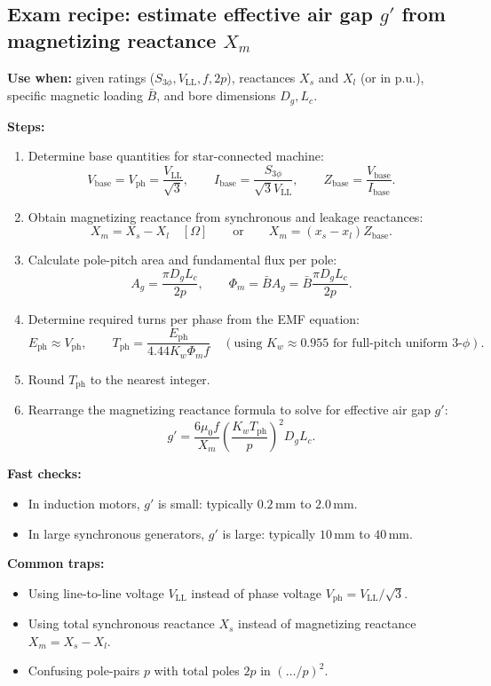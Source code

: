 \subsection{Exam recipe: estimate effective air gap $g'$ from magnetizing reactance $X_m$}

\textbf{Use when:} given ratings (\(S_{3\phi}, V_{\mathrm{LL}}, f, 2p\)), reactances \(X_s\) and \(X_l\) (or in p.u.), specific magnetic loading \(\bar{B}\), and bore dimensions \(D_g, L_c\).

\textbf{Steps:}
\begin{enumerate}
  \item Determine base quantities for star-connected machine:
  \[
  V_{\mathrm{base}} = V_{\mathrm{ph}} = \frac{V_{\mathrm{LL}}}{\sqrt{3}},
  \qquad
  I_{\mathrm{base}} = \frac{S_{3\phi}}{\sqrt{3} V_{\mathrm{LL}}},
  \qquad
  Z_{\mathrm{base}} = \frac{V_{\mathrm{base}}}{I_{\mathrm{base}}}.
  \]
  \item Obtain magnetizing reactance from synchronous and leakage reactances:
  \[
  X_m = X_s - X_l\quad[\Omega]
  \qquad\text{or}\qquad
  X_m = (x_s - x_l) Z_{\mathrm{base}}.
  \]
  \item Calculate pole-pitch area and fundamental flux per pole:
  \[
  A_g = \frac{\pi D_g L_c}{2p},
  \qquad
  \Phi_m = \bar{B} A_g = \bar{B}\frac{\pi D_g L_c}{2p}.
  \]
  \item Determine required turns per phase from the EMF equation:
  \[
  E_{\mathrm{ph}} \approx V_{\mathrm{ph}},
  \qquad
  T_{\mathrm{ph}} = \frac{E_{\mathrm{ph}}}{4.44 K_w \Phi_m f}
  \quad(\text{using } K_w \approx 0.955\text{ for full-pitch uniform 3-}\phi).
  \]
  \item Round \(T_{\mathrm{ph}}\) to the nearest integer.
  \item Rearrange the magnetizing reactance formula to solve for effective air gap \(g'\):
  \[
  g' = \frac{6\mu_0 f}{X_m}\left(\frac{K_w T_{\mathrm{ph}}}{p}\right)^2 D_g L_c.
  \]
\end{enumerate}

\textbf{Fast checks:}
\begin{itemize}
  \item In induction motors, \(g'\) is small: typically \(0.2\,\mathrm{mm}\) to \(2.0\,\mathrm{mm}\).
  \item In large synchronous generators, \(g'\) is large: typically \(10\,\mathrm{mm}\) to \(40\,\mathrm{mm}\).
\end{itemize}

\textbf{Common traps:}
\begin{itemize}
  \item Using line-to-line voltage \(V_{\mathrm{LL}}\) instead of phase voltage \(V_{\mathrm{ph}} = V_{\mathrm{LL}}/\sqrt{3}\).
  \item Using total synchronous reactance \(X_s\) instead of magnetizing reactance \(X_m = X_s - X_l\).
  \item Confusing pole-pairs \(p\) with total poles \(2p\) in \((\dots / p)^2\).
\end{itemize}

